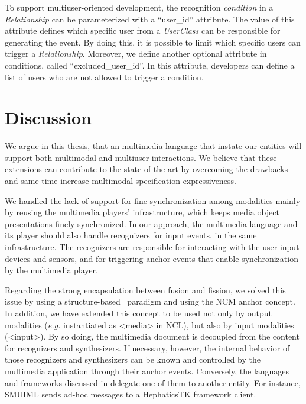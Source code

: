 To support multiuser-oriented development, the recognition \textit{condition} in
a \textit{Relationship} can be parameterized with a “user\_id” attribute. The
value of this attribute defines which specific user from a \textit{UserClass}
can be responsible for generating the event. By doing this, it is possible to
limit which specific users can trigger a \textit{Relationship}. Moreover, we
define another optional attribute in conditions, called “excluded\_user\_id”. In this attribute, developers can define a list of users who are not allowed to
trigger a condition.

\section{Discussion}
\label{sec:approuch:discussion}

We argue in this thesis, that an multimedia language that instate our entities will support both multimodal and multiuser interactions. We believe that these extensions can contribute to the state of the art by overcoming the drawbacks and same time increase multimodal specification expressiveness.

We handled the lack of support for fine synchronization among modalities mainly
by reusing the multimedia players’ infrastructure, which keeps media object
presentations finely synchronized. In our approach, the multimedia language and
its player should also handle recognizers for input events, in the same
infrastructure. The recognizers are responsible for interacting with the user
input devices and sensors, and for triggering anchor events that enable
synchronization by the multimedia player.

Regarding the strong encapsulation between fusion and fission, we solved this
issue by using a structure-based~\cite{bulterman_structured_2005} paradigm and
using the NCM anchor concept. In addition, we have extended this concept to be
used not only by output modalities (\textit{e.g.} instantiated as <media> in NCL), but
also by input modalities (<input>). By so doing, the multimedia document is
decoupled from the content for recognizers and synthesizers. If necessary,
however, the internal behavior of those recognizers and synthesizers can be
known and controlled by the multimedia application through their anchor events.
Conversely, the languages and frameworks discussed in 
delegate one of
them to another entity. For instance, SMUIML sends ad-hoc messages to a
HephaticsTK framework client.

